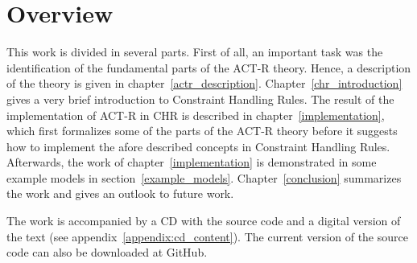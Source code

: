 \section{Overview}

This work is divided in several parts. First of all, an important task was the identification of the fundamental parts of the ACT-R theory. Hence, a description of the theory is given in chapter~\ref{actr_description}. Chapter~\ref{chr_introduction} gives a very brief introduction to Constraint Handling Rules. The result of the implementation of ACT-R in CHR is described in chapter~\ref{implementation}, which first formalizes some of the parts of the ACT-R theory before it suggests how to implement the afore described concepts in Constraint Handling Rules. Afterwards, the work of chapter~\ref{implementation} is demonstrated in some example models in section~\ref{example_models}. Chapter~\ref{conclusion} summarizes the work and gives an outlook to future work.

The work is accompanied by a CD with the source code and a digital version of the text (see appendix~\ref{appendix:cd_content}). The current version of the source code can also be downloaded at GitHub.
